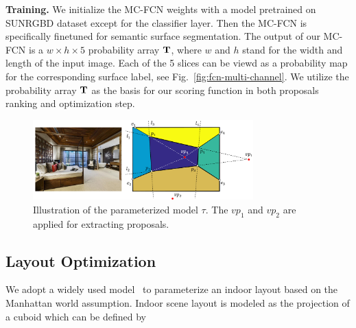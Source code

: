 \noindent\textbf{Training.} We initialize the MC-FCN weights with a model pretrained on SUNRGBD dataset except for the classifier layer. Then the MC-FCN is specifically finetuned for semantic surface segmentation. 
%
The output of our MC-FCN is a $w\times h \times 5$ probability array $\mathbf{T}$, where $w$ and $h$ stand for the width and length of the input image. Each of the 5 slices can be viewd as a probability map for the corresponding surface label, see Fig.~\ref{fig:fcn-multi-channel}. We utilize the probability array $\mathbf{T}$ as the basis for our scoring function in both proposals ranking and optimization step. 



\begin{figure}
	\centering
	\includegraphics[width=8.5cm]{figure/parameterization.png}
	\caption{ Illustration of the parameterized model $\tau$. The $vp_1$ and $vp_2$ are applied for extracting proposals. }
	\label{fig:parameterization}
\end{figure}


\subsection{Layout Optimization}
\label{sec:optimization}
We adopt a widely used model~\cite{hedau2009recovering, wang2013discriminative, dasgupta2016delay, ren2016coarse} to parameterize an indoor layout based on the Manhattan world assumption. Indoor scene layout is modeled as the projection of a cuboid which can be defined by 

